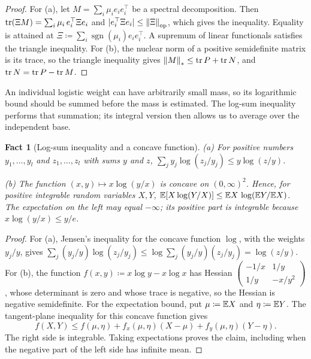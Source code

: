 \documentclass[11pt,letterpaper]{article}
\theoremstyle{plain}
\newtheorem{fact}{Fact}[section]
\begin{document}
\begin{proof}
For (a), let \(M=\sum_i\mu_ie_ie_i^\top\) be a spectral decomposition. Then
\(\operatorname{tr}(\Xi M)=\sum_i\mu_i\,e_i^\top\Xi e_i\) and \(|e_i^\top\Xi e_i|\le
\left\lVert\Xi\right\rVert_{\mathrm{op}}\), which gives the inequality. Equality is attained at
\(\Xi\coloneqq \sum_i\operatorname{sgn}(\mu_i)e_ie_i^\top\). A supremum of linear
functionals satisfies the triangle inequality. For (b), the nuclear norm of a
positive semidefinite matrix is its trace, so the triangle inequality gives
\(\left\lVert M\right\rVert_*\le\operatorname{tr} P+\operatorname{tr} N\), and \(\operatorname{tr} N=\operatorname{tr} P-\operatorname{tr} M\).
\end{proof}


An individual logistic weight can have arbitrarily small mass, so its
logarithmic bound should be summed before the mass is estimated. The
log-sum inequality performs that summation; its integral version then
allows us to average over the independent base.

\begin{fact}[Log-sum inequality and a concave function]\label{tb:logsum}
(a) For positive numbers \(y_1,\ldots,y_l\) and \(z_1,\ldots,z_l\) with sums
\(y\) and \(z\),
\(\sum_jy_j\log(z_j/y_j)\le y\log(z/y)\).

(b) The function \((x,y)\mapsto x\log(y/x)\) is concave on \((0,\infty)^2\).
Hence, for positive integrable random variables \(X,Y\),
\(\mathbb E[X\log(Y/X)]\le\mathbb E X\,\log(\mathbb E Y/\mathbb E X)\).
The expectation on the left may equal \(-\infty\); its positive
part is integrable because \(x\log(y/x)\le y/e\).
\end{fact}

\begin{proof}
For (a), Jensen's inequality for the concave function \(\log\), with the
weights \(y_j/y\), gives \(\sum_j(y_j/y)\log(z_j/y_j)\le\log\sum_j(y_j/y)(z_j/y_j)
=\log(z/y)\). For (b), the function \(f(x,y)\coloneqq x\log y-x\log x\) has Hessian
\(\begin{pmatrix}-1/x&1/y\\1/y&-x/y^2\end{pmatrix}\), whose determinant is
zero and whose trace is negative, so the Hessian is negative semidefinite.
For the expectation bound, put \(\mu\coloneqq\mathbb E X\) and
\(\eta\coloneqq\mathbb E Y\). The tangent-plane inequality for this concave
function gives
\[
 f(X,Y)\le f(\mu,\eta)
   +f_x(\mu,\eta)(X-\mu)+f_y(\mu,\eta)(Y-\eta).
\]
The right side is integrable. Taking expectations proves the claim,
including when the negative part of the left side has infinite mean.
\end{proof}
\end{document}
